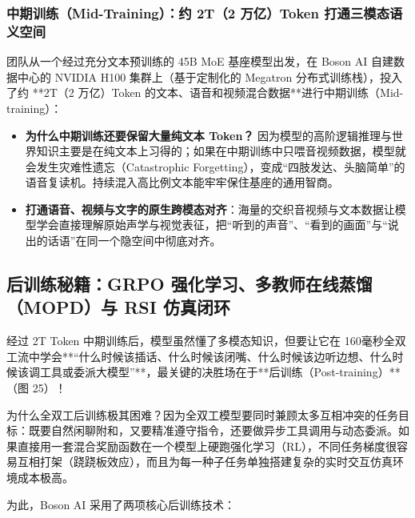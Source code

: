 \documentclass[a4paper]{article}
\begin{document}
\subsubsection{中期训练（Mid-Training）：约 2T（2 万亿）Token 打通三模态语义空间}
团队从一个经过充分文本预训练的 45B MoE 基座模型出发，在 Boson AI 自建数据中心的 NVIDIA H100 集群上（基于定制化的 Megatron 分布式训练栈），投入了约 **2T（2 万亿）Token 的文本、语音和视频混合数据**进行中期训练（Mid-training）：
\begin{itemize}
    \item \textbf{为什么中期训练还要保留大量纯文本 Token？} 因为模型的高阶逻辑推理与世界知识主要是在纯文本上习得的；如果在中期训练中只喂音视频数据，模型就会发生灾难性遗忘（Catastrophic Forgetting），变成“四肢发达、头脑简单”的语音复读机。持续混入高比例文本能牢牢保住基座的通用智商。
    \item \textbf{打通语音、视频与文字的原生跨模态对齐}：海量的交织音视频与文本数据让模型学会直接理解原始声学与视觉表征，把“听到的声音”、“看到的画面”与“说出的话语”在同一个隐空间中彻底对齐。
\end{itemize}

\subsection{后训练秘籍：GRPO 强化学习、多教师在线蒸馏（MOPD）与 RSI 仿真闭环}

经过 2T Token 中期训练后，模型虽然懂了多模态知识，但要让它在 160毫秒全双工流中学会**“什么时候该插话、什么时候该闭嘴、什么时候该边听边想、什么时候该调工具或委派大模型”**，最关键的决胜场在于**后训练（Post-training）**（图 25）！

为什么全双工后训练极其困难？因为全双工模型要同时兼顾太多互相冲突的任务目标：既要自然闲聊附和，又要精准遵守指令，还要做异步工具调用与动态委派。如果直接用一套混合奖励函数在一个模型上硬跑强化学习（RL），不同任务梯度很容易互相打架（跷跷板效应），而且为每一种子任务单独搭建复杂的实时交互仿真环境成本极高。

为此，Boson AI 采用了两项核心后训练技术：
\end{document}
